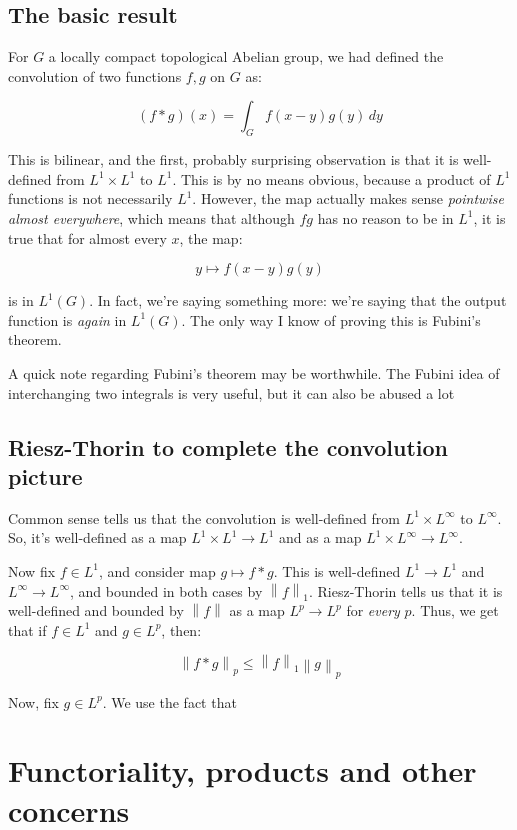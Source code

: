 \documentclass[a4paper]{amsart}
\newcommand{\norm}[1]{\left\|#1\right\|}
\begin{document}
\subsection{The basic result}

For $G$ a locally compact topological Abelian group, we had defined
the convolution of two functions $f,g$ on $G$ as:

$$(f * g)(x) = \int_G f(x - y) g(y) \, dy$$

This is bilinear, and the first, probably surprising observation is
that it is well-defined from $L^1 \times L^1$ to $L^1$. This is by no
means obvious, because a product of $L^1$ functions is not necessarily
$L^1$. However, the map actually makes sense {\em pointwise almost
  everywhere}, which means that although $fg$ has no reason to be in
$L^1$, it is true that for almost every $x$, the map:

$$y \mapsto f(x-y)g(y)$$

is in $L^1(G)$. In fact, we're saying something more: we're saying
that the output function is {\em again} in $L^1(G)$. The only way I
know of proving this is Fubini's theorem.

A quick note regarding Fubini's theorem may be worthwhile. The Fubini
idea of interchanging two integrals is very useful, but it can also be
abused a lot %

\subsection{Riesz-Thorin to complete the convolution picture}

Common sense tells us that the convolution is well-defined from $L^1
\times L^\infty$ to $L^\infty$. So, it's well-defined as a map $L^1
\times L^1 \to L^1$ and as a map $L^1 \times L^\infty \to L^\infty$.

Now fix $f \in L^1$, and consider map $g \mapsto f * g$. This is
well-defined $L^1 \to L^1$ and $L^\infty \to L^\infty$, and bounded in
both cases by $\norm{f}_1$. Riesz-Thorin tells us that it is
well-defined and bounded by $\norm{f}$ as a map $L^p \to L^p$ for {\em
  every} $p$. Thus, we get that if $f \in L^1$ and $g \in L^p$, then:

$$\norm{f * g}_p \le \norm{f}_1 \norm{g}_p$$

Now, fix $g \in L^p$. We use the fact that %

\section{Functoriality, products and other concerns}
\end{document}
